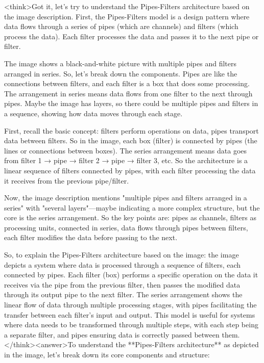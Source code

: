 <think>Got it, let's try to understand the Pipes-Filters architecture based on the image description. First, the Pipes-Filters model is a design pattern where data flows through a series of pipes (which are channels) and filters (which process the data). Each filter processes the data and passes it to the next pipe or filter. 

The image shows a black-and-white picture with multiple pipes and filters arranged in series. So, let's break down the components. Pipes are like the connections between filters, and each filter is a box that does some processing. The arrangement in series means data flows from one filter to the next through pipes. Maybe the image has layers, so there could be multiple pipes and filters in a sequence, showing how data moves through each stage.

First, recall the basic concept: filters perform operations on data, pipes transport data between filters. So in the image, each box (filter) is connected by pipes (the lines or connections between boxes). The series arrangement means data goes from filter 1 → pipe → filter 2 → pipe → filter 3, etc. So the architecture is a linear sequence of filters connected by pipes, with each filter processing the data it receives from the previous pipe/filter.

Now, the image description mentions "multiple pipes and filters arranged in a series" with "several layers"—maybe indicating a more complex structure, but the core is the series arrangement. So the key points are: pipes as channels, filters as processing units, connected in series, data flows through pipes between filters, each filter modifies the data before passing to the next.

So, to explain the Pipes-Filters architecture based on the image: the image depicts a system where data is processed through a sequence of filters, each connected by pipes. Each filter (box) performs a specific operation on the data it receives via the pipe from the previous filter, then passes the modified data through its output pipe to the next filter. The series arrangement shows the linear flow of data through multiple processing stages, with pipes facilitating the transfer between each filter's input and output. This model is useful for systems where data needs to be transformed through multiple steps, with each step being a separate filter, and pipes ensuring data is correctly passed between them.</think><answer>To understand the **Pipes-Filters architecture** as depicted in the image, let’s break down its core components and structure:  


